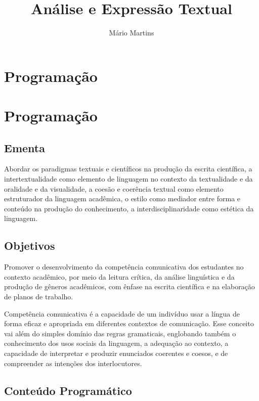 \documentclass[
  letterpaper,
  DIV=11,
  numbers=noendperiod]{scrreprt}
\title{Análise e Expressão Textual}
\author{Mário Martins}
\date{}
\renewcommand*\contentsname{Table of contents}
\newcommand\contentsname{Table of contents}
\begin{document}
\maketitle

\renewcommand*\contentsname{Table of contents}
{
\hypersetup{linkcolor=}
\setcounter{tocdepth}{2}
\tableofcontents
}

\chapter{Programação}\label{programauxe7uxe3o}

\chapter{Programação}\label{programauxe7uxe3o-1}

\section{Ementa}\label{ementa}

Abordar os paradigmas textuais e científicos na produção da escrita
científica, a intertextualidade como elemento de linguagem no contexto
da textualidade e da oralidade e da visualidade, a coesão e coerência
textual como elemento estruturador da linguagem acadêmica, o estilo como
mediador entre forma e conteúdo na produção do conhecimento, a
interdisciplinaridade como estética da linguagem.

\section{Objetivos}\label{objetivos}

Promover o desenvolvimento da competência comunicativa dos estudantes no
contexto acadêmico, por meio da leitura crítica, da análise linguística
e da produção de gêneros acadêmicos, com ênfase na escrita científica e
na elaboração de planos de trabalho.

Competência comunicativa é a capacidade de um indivíduo usar a língua de
forma eficaz e apropriada em diferentes contextos de comunicação. Esse
conceito vai além do simples domínio das regras gramaticais, englobando
também o conhecimento dos usos sociais da linguagem, a adequação ao
contexto, a capacidade de interpretar e produzir enunciados coerentes e
coesos, e de compreender as intenções dos interlocutores.

\section{Conteúdo Programático}\label{conteuxfado-programuxe1tico}
\end{document}
